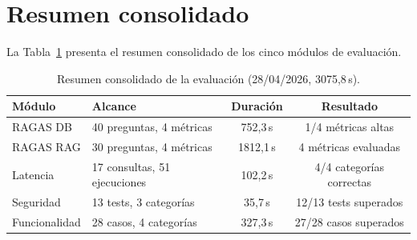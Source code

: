 \section{Resumen consolidado}
\label{sec:res_resumen}

La Tabla~\ref{tab:res_resumen} presenta el resumen consolidado de los cinco módulos de evaluación.

\begin{table}[H]
\centering
\caption{Resumen consolidado de la evaluación (28/04/2026, 3075,8\,s).}
\label{tab:res_resumen}
\footnotesize
\begin{tabularx}{\columnwidth}{lXcc}
\toprule
\textbf{Módulo} & \textbf{Alcance} & \textbf{Duración} & \textbf{Resultado} \\
\midrule
\ac{RAGAS} DB       & 40 preguntas, 4 métricas   & 752,3\,s  & 1/4 métricas altas \\
\ac{RAGAS} \ac{RAG}      & 30 preguntas, 4 métricas   & 1812,1\,s & 4 métricas evaluadas \\
Latencia       & 17 consultas, 51 ejecuciones & 102,2\,s & 4/4 categorías correctas \\
Seguridad      & 13 tests, 3 categorías     & 35,7\,s   & 12/13 tests superados \\
Funcionalidad  & 28 casos, 4 categorías     & 327,3\,s  & 27/28 casos superados \\
\bottomrule
\end{tabularx}
\end{table}
